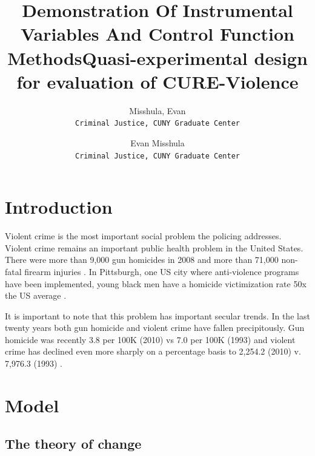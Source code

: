 \documentclass[11pt]{article}
\author{Misshula, Evan\\ \texttt{Criminal Justice, CUNY Graduate Center}}
\title{Demonstration Of Instrumental Variables And Control Function Methods}
\author{Evan Misshula\\ \texttt{Criminal Justice, CUNY Graduate Center}}
\date{}
\title{Quasi-experimental design for evaluation of CURE-Violence}
\begin{document}
\maketitle





\section{Introduction}
\label{sec-1}

Violent crime is the most important social problem the policing
addresses. Violent crime remains an important public health problem in
the United States.  There were more than 9,000 gun homicides in 2008
\parencite{fbi2} and more than 71,000 non-fatal firearm injuries
\parencite{center2012injury}.  In Pittsburgh, one US city where
anti-violence programs have been implemented, young black men have a
homicide victimization rate 50x the US average \parencite{ovol2005}.

It is important to note that this problem has important secular
trends.  In the last twenty years both gun homicide and violent crime
have fallen precipitously. Gun homicide was recently 3.8 per 100K
(2010) vs 7.0 per 100K (1993) and violent crime has declined even more
sharply on a percentage basis to 2,254.2 (2010) v. 7,976.3 (1993)
\parencite{fbi1}.
\section{Model}
\label{sec-2}

\subsection{The theory of change}
\label{sec-2-1}
\end{document}
